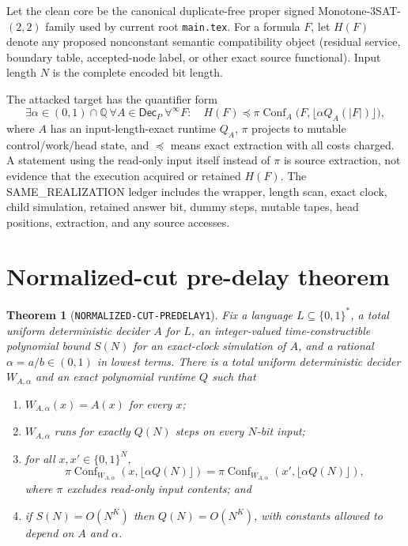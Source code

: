 \documentclass[11pt]{article}
\newtheorem{theorem}{Theorem}
\begin{document}
Let the clean core be the canonical duplicate-free proper signed
Monotone-$3$SAT-$(2,2)$ family used by current root \texttt{main.tex}.  For a
formula $F$, let $H(F)$ denote any proposed nonconstant semantic compatibility
object (residual service, boundary table, accepted-node label, or other exact
source functional).  Input length $N$ is the complete encoded bit length.

The attacked target has the quantifier form
\[
 \exists\alpha\in(0,1)\cap\mathbb Q\ \forall A\in\mathsf{Dec}_{P}
 \ \forall^{\infty}F:\quad
 H(F)\preceq \pi\!\operatorname{Conf}_A
 \bigl(F,\lfloor\alpha Q_A(|F|)\rfloor\bigr),             \tag{1}
\]
where $A$ has an input-length-exact runtime $Q_A$, $\pi$ projects to mutable
control/work/head state, and $\preceq$ means exact extraction with all costs
charged.  A statement using the read-only input itself instead of $\pi$ is
source extraction, not evidence that the execution acquired or retained
$H(F)$.  The SAME\_REALIZATION ledger includes the wrapper, length scan, exact
clock, child simulation, retained answer bit, dummy steps, mutable tapes, head
positions, extraction, and any source accesses.

\section{Normalized-cut pre-delay theorem}

\begin{theorem}[\texttt{NORMALIZED-CUT-PREDELAY1}]
Fix a language $L\subseteq\{0,1\}^*$, a total uniform deterministic decider
$A$ for $L$, an integer-valued time-constructible polynomial bound $S(N)$ for
an exact-clock simulation of $A$, and a rational
$\alpha=a/b\in(0,1)$ in lowest terms.  There is a total uniform deterministic
decider $W_{A,\alpha}$ and an exact polynomial runtime $Q$ such that
\begin{enumerate}[label=(\roman*)]
\item $W_{A,\alpha}(x)=A(x)$ for every $x$;
\item $W_{A,\alpha}$ runs for exactly $Q(N)$ steps on every $N$-bit input;
\item for all $x,x'\in\{0,1\}^N$,
\[
 \pi\!\operatorname{Conf}_{W_{A,\alpha}}
    (x,\lfloor\alpha Q(N)\rfloor)
 =
 \pi\!\operatorname{Conf}_{W_{A,\alpha}}
    (x',\lfloor\alpha Q(N)\rfloor),                     \tag{2}
\]
where $\pi$ excludes read-only input contents; and
\item if $S(N)=O(N^K)$ then $Q(N)=O(N^K)$, with constants allowed to depend on
$A$ and $\alpha$.
\end{enumerate}
\end{theorem}
\end{document}
